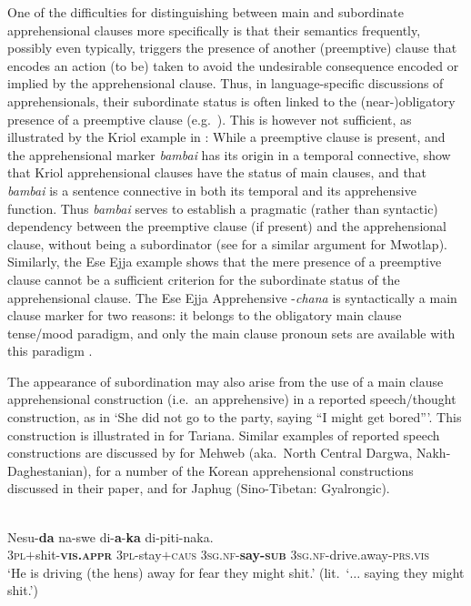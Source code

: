\documentclass[output=paper,colorlinks,citecolor=brown
]{langscibook}
\begin{document}
One of the difficulties for distinguishing between main and subordinate apprehensional clauses more specifically is that their semantics frequently, possibly even typically, triggers the presence of another (preemptive) clause that encodes an action (to be) taken to avoid the undesirable consequence encoded or implied by the apprehensional clause. Thus, in language-specific discussions of apprehensionals, their subordinate status is often linked to the (near-)obligatory presence of a preemptive clause (e.g.\ \cite{smithdennis2021}). This is however not sufficient, as illustrated by the Kriol example in : While a preemptive clause is present, and the apprehensional marker \textit{bambai} has its origin in a temporal connective, \citet{angeloschultzeberndt2016} show that Kriol apprehensional clauses have the status of main clauses, and that \textit{bambai} is a sentence connective in both its temporal and its apprehensive function. Thus \textit{bambai} serves to establish a pragmatic (rather than syntactic) dependency between the preemptive clause (if present) and the apprehensional clause, without being a subordinator (see \citealt{chapters/francois} for a similar argument for Mwotlap). Similarly, the Ese Ejja example  shows that the mere presence of a preemptive clause cannot be a sufficient criterion for the subordinate status of the apprehensional clause. The Ese Ejja Apprehensive \nobreakdash-\textit{chana} is syntactically a main clause marker for two reasons: it belongs to the obligatory main clause tense/mood paradigm, and only the main clause pronoun sets are available with this paradigm \citep[267--268]{vuillermet2018a}.

The appearance of subordination may also arise from the use of a main clause apprehensional construction (i.e.\ an apprehensive) in a reported speech\slash thought construction, as in `She did not go to the party, saying ``I might get bored'''. This construction is illustrated in  for Tariana. Similar examples of reported speech constructions are discussed by  \citet{chapters/daniel} for Mehweb (aka.\ North Central Dargwa, Nakh-Daghestanian),  \citet{chapters/rhee-kuteva} for a number of the Korean apprehensional constructions discussed in their paper, and \citet[1170]{jacques2021} for Japhug (Sino-Tibetan: Gyalrongic).

\ea \label{ex:intro9} 
\\
\gll {\ob}Nesu-\textbf{da} na-swe di-\textbf{a}-\textbf{ka}{\cb} di-piti-naka. \\
\textsc{3pl}$+$shit-\textsc{\textbf{vis.appr}} \textsc{3pl-}stay$+$\textsc{caus} \textsc{3sg.nf-}\textbf{say-\textsc{sub}} \textsc{3sg.nf-}drive.away-\textsc{prs.vis} \\
\glt `He is driving (the hens) away for fear they might shit.' (lit.\  `$\ldots$ saying they might shit.')
\z
\end{document}
